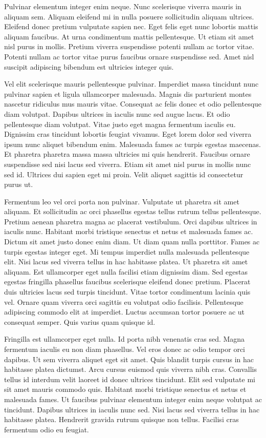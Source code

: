 \documentclass[11pt,a4paper]{article}
\begin{document}
Pulvinar elementum integer enim neque. Nunc scelerisque viverra mauris in aliquam sem. Aliquam eleifend mi in nulla posuere sollicitudin aliquam ultrices. Eleifend donec pretium vulputate sapien nec. Eget felis eget nunc lobortis mattis aliquam faucibus. At urna condimentum mattis pellentesque. Ut etiam sit amet nisl purus in mollis. Pretium viverra suspendisse potenti nullam ac tortor vitae. Potenti nullam ac tortor vitae purus faucibus ornare suspendisse sed. Amet nisl suscipit adipiscing bibendum est ultricies integer quis.

Vel elit scelerisque mauris pellentesque pulvinar. Imperdiet massa tincidunt nunc pulvinar sapien et ligula ullamcorper malesuada. Magnis dis parturient montes nascetur ridiculus mus mauris vitae. Consequat ac felis donec et odio pellentesque diam volutpat. Dapibus ultrices in iaculis nunc sed augue lacus. Et odio pellentesque diam volutpat. Vitae justo eget magna fermentum iaculis eu. Dignissim cras tincidunt lobortis feugiat vivamus. Eget lorem dolor sed viverra ipsum nunc aliquet bibendum enim. Malesuada fames ac turpis egestas maecenas. Et pharetra pharetra massa massa ultricies mi quis hendrerit. Faucibus ornare suspendisse sed nisi lacus sed viverra. Etiam sit amet nisl purus in mollis nunc sed id. Ultrices dui sapien eget mi proin. Velit aliquet sagittis id consectetur purus ut.

Fermentum leo vel orci porta non pulvinar. Vulputate ut pharetra sit amet aliquam. Et sollicitudin ac orci phasellus egestas tellus rutrum tellus pellentesque. Pretium aenean pharetra magna ac placerat vestibulum. Orci dapibus ultrices in iaculis nunc. Habitant morbi tristique senectus et netus et malesuada fames ac. Dictum sit amet justo donec enim diam. Ut diam quam nulla porttitor. Fames ac turpis egestas integer eget. Mi tempus imperdiet nulla malesuada pellentesque elit. Nisi lacus sed viverra tellus in hac habitasse platea. Ut pharetra sit amet aliquam. Est ullamcorper eget nulla facilisi etiam dignissim diam. Sed egestas egestas fringilla phasellus faucibus scelerisque eleifend donec pretium. Placerat duis ultricies lacus sed turpis tincidunt. Vitae tortor condimentum lacinia quis vel. Ornare quam viverra orci sagittis eu volutpat odio facilisis. Pellentesque adipiscing commodo elit at imperdiet. Luctus accumsan tortor posuere ac ut consequat semper. Quis varius quam quisque id.

Fringilla est ullamcorper eget nulla. Id porta nibh venenatis cras sed. Magna fermentum iaculis eu non diam phasellus. Vel eros donec ac odio tempor orci dapibus. Ut sem viverra aliquet eget sit amet. Quis blandit turpis cursus in hac habitasse platea dictumst. Arcu cursus euismod quis viverra nibh cras. Convallis tellus id interdum velit laoreet id donec ultrices tincidunt. Elit sed vulputate mi sit amet mauris commodo quis. Habitant morbi tristique senectus et netus et malesuada fames. Ut faucibus pulvinar elementum integer enim neque volutpat ac tincidunt. Dapibus ultrices in iaculis nunc sed. Nisi lacus sed viverra tellus in hac habitasse platea. Hendrerit gravida rutrum quisque non tellus. Facilisi cras fermentum odio eu feugiat.
\end{document}
